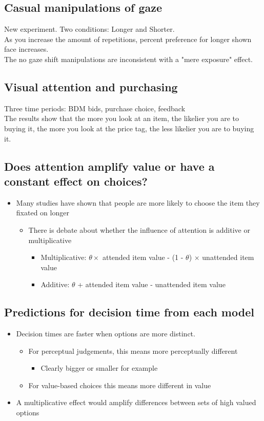 \subsection{Casual manipulations of gaze}
New experiment. Two conditions: Longer and Shorter.
\\As you increase the amount of repetitions, percent preference for longer shown face increases.
\\The no gaze shift manipulations are inconsistent with a "mere exposure" effect.
\subsection{Visual attention and purchasing}
Three time periods: BDM bids, purchase choice, feedback
\\The results show that the more you look at an item, the likelier you are to buying it, the more you look at the price tag, the less likelier you are to buying it.
\subsection{Does attention amplify value or have a constant effect on choices?}
\begin{itemize}
    \item Many studies have shown that people are more likely to choose the item they fixated on longer
    \begin{itemize}
        \item There is debate about whether the influence of attention is additive or multiplicative
        \begin{itemize}
            \item Multiplicative: $\theta \times$ attended item value - (1 - $\theta$) $\times$ unattended item value
            \item Additive: $\theta$ + attended item value - unattended item value
        \end{itemize}
    \end{itemize}
\end{itemize}

\subsection{Predictions for decision time from each model}
\begin{itemize}
    \item Decision times are faster when options are more distinct.
    \begin{itemize}
        \item For perceptual judgements, this means more perceptually different
        \begin{itemize}
            \item Clearly bigger or smaller for example
        \end{itemize}
        \item For value-based choices this means more different in value
    \end{itemize}
    \item A multiplicative effect would amplify differences between sets of high valued options
\end{itemize}

